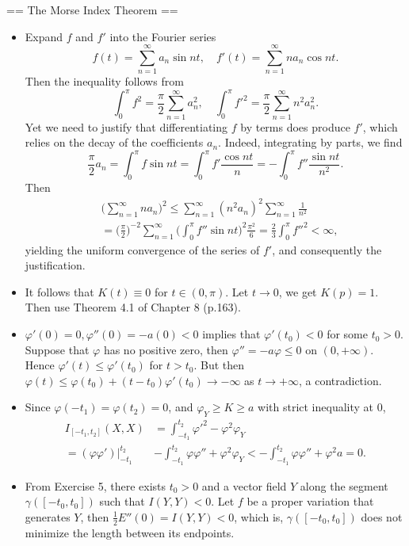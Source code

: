 == The Morse Index Theorem ==

\begin{itemize}
    \item[2.] Expand $f$ and $f'$ into the Fourier series
    \[f(t)=\sum_{n=1}^\infty a_n\sin nt,\quad 
    f'(t)=\sum_{n=1}^\infty na_n\cos nt.\]
    Then the inequality follows from
    \[\int_0^\pi f^2=\frac{\pi}{2}\sum_{n=1}^\infty a_n^2,\quad 
    \int_0^\pi f'^2=\frac{\pi}{2}\sum_{n=1}^\infty n^2a_n^2.\] 
    Yet we need to justify that differentiating $f$ by terms 
    does produce $f'$, which relies on the decay of the coefficients $a_n$. 
    Indeed, integrating by parts, we find
    \[\frac{\pi}{2}a_n=\int_0^\pi f\sin nt=\int_0^\pi f'\frac{\cos nt}{n}
    =-\int_0^\pi f''\frac{\sin nt}{n^2}.\]
    Then
    \begin{align*}&\bigg(\sum_{n=1}^\infty na_n\bigg)^2
    \le\sum_{n=1}^\infty(n^2a_n)^2\sum_{n=1}^\infty\frac{1}{n^2}\\
    &=\Big(\frac{\pi}{2}\Big)^{-2}\sum_{n=1}^\infty\bigg(\int_0^\pi f''\sin nt\bigg)^2\frac{\pi^2}{6}
    =\frac{2}{3}\int_0^\pi f''^2<\infty,\end{align*}
    yielding the uniform convergence of the series of $f'$, 
    and consequently the justification.

    \item[3.] It follows that $K(t)\equiv0$ for $t\in(0,\pi)$. 
    Let $t\to0$, we get $K(p)=1$. Then use Theorem 4.1 of Chapter 8 (p.163).

    \item[4.] $\varphi'(0)=0,\varphi''(0)=-a(0)<0$ implies that 
    $\varphi'(t_0)<0$ for some $t_0>0$. Suppose that $\varphi$ 
    has no positive zero, then $\varphi''=-a\varphi\le0$ on $(0,+\infty)$. 
    Hence $\varphi'(t)\le\varphi'(t_0)$ for $t>t_0$. 
    But then $\varphi(t)\le\varphi(t_0)+(t-t_0)\varphi'(t_0)\to-\infty$ 
    as $t\to+\infty$, a contradiction.

    \item[5.] Since $\varphi(-t_1)=\varphi(t_2)=0$, 
    and $\varphi_Y\ge K\ge a$ with strict inequality at $0$,
    \begin{align*}
        I_{[-t_1,t_2]}(X,X)&=\int_{-t_1}^{t_2}\varphi'^2-\varphi^2\varphi_Y\\
        =(\varphi\varphi')\big|_{-t_1}^{t_2}
        &-\int_{-t_1}^{t_2}\varphi\varphi''+\varphi^2\varphi_Y
        <-\int_{-t_1}^{t_2}\varphi\varphi''+\varphi^2a=0.
    \end{align*}

    \item[6.] From Exercise 5, there exists $t_0>0$ 
    and a vector field $Y$ along the segment $\gamma([-t_0,t_0])$ 
    such that $I(Y,Y)<0$. Let $f$ be a proper variation that generates $Y$, 
    then $\frac{1}{2}E''(0)=I(Y,Y)<0$, which is, 
    $\gamma([-t_0,t_0])$ does not minimize the length between its endpoints.


\end{itemize}
